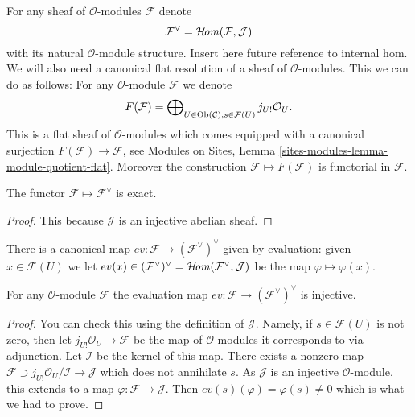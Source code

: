 \medskip\noindent
For any sheaf of $\mathcal{O}$-modules $\mathcal{F}$ denote
$$
\mathcal{F}^\vee
=
\mathop{\mathcal{H}\!{\it om}}\nolimits(\mathcal{F}, \mathcal{J})
$$
with its natural $\mathcal{O}$-module structure.
Insert here future reference to internal hom.
We will also need
a canonical flat resolution of a sheaf of $\mathcal{O}$-modules.
This we can do as follows: For any $\mathcal{O}$-module
$\mathcal{F}$ we denote
$$
F(\mathcal{F})
=
\bigoplus\nolimits_{U \in \mathop{\rm Ob}\nolimits(\mathcal{C}), s \in \mathcal{F}(U)}
j_{U!}\mathcal{O}_U.
$$
This is a flat sheaf of $\mathcal{O}$-modules which comes equipped
with a canonical surjection $F(\mathcal{F}) \to \mathcal{F}$, see
Modules on Sites, Lemma \ref{sites-modules-lemma-module-quotient-flat}.
Moreover the construction $\mathcal{F} \mapsto F(\mathcal{F})$
is functorial in $\mathcal{F}$.

\begin{lemma}
\label{lemma-vee-exact-sheaves}
The functor $\mathcal{F} \mapsto \mathcal{F}^\vee$ is exact.
\end{lemma}

\begin{proof}
This because $\mathcal{J}$ is an injective abelian sheaf.
\end{proof}

\noindent
There is a canonical map $ev : \mathcal{F} \to (\mathcal{F}^\vee)^\vee$
given by evaluation: given $x \in \mathcal{F}(U)$ we let
$ev(x) \in (\mathcal{F}^\vee)^\vee =
\mathop{\mathcal{H}\!{\it om}}\nolimits(\mathcal{F}^\vee, \mathcal{J})$
be the map $\varphi \mapsto \varphi(x)$.

\begin{lemma}
\label{lemma-ev-injective-sheaves}
For any $\mathcal{O}$-module $\mathcal{F}$ the evaluation map
$ev : \mathcal{F} \to (\mathcal{F}^\vee)^\vee$ is injective.
\end{lemma}

\begin{proof}
You can check this using the definition of $\mathcal{J}$.
Namely, if $s \in \mathcal{F}(U)$ is not zero, then let
$j_{U!}\mathcal{O}_U \to \mathcal{F}$ be the map of
$\mathcal{O}$-modules it corresponds to via adjunction.
Let $\mathcal{I}$ be the kernel of this map. There exists
a nonzero map $\mathcal{F} \supset j_{U!}\mathcal{O}_U/\mathcal{I}
\to \mathcal{J}$ which does not annihilate $s$. As $\mathcal{J}$ is
an injective $\mathcal{O}$-module, this extends to a map
$\varphi : \mathcal{F} \to \mathcal{J}$.
Then $ev(s)(\varphi) = \varphi(s) \not = 0$ which is what we had to prove.
\end{proof}

